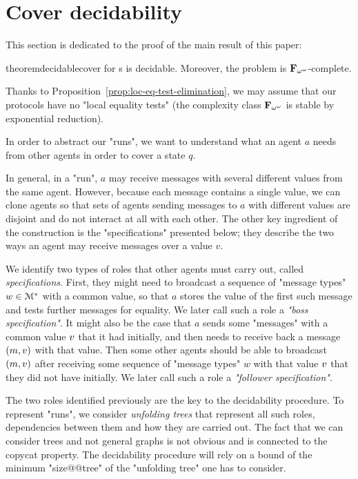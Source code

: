 \section{Cover decidability}
\label{sec:cover-decidability}

This section is dedicated to the proof of the main result of this paper:

\begin{restatable}{theorem}{decidablecover}
\label{thm:decidable-cover}
\COVER for \BNRA{}s is decidable. Moreover, the problem is $\mathbf{F}_{\omega^\omega}$-complete.
\end{restatable}

Thanks to Proposition~\ref{prop:loc-eq-test-elimination}, we may assume that our protocols have no "local equality tests" (the complexity class $\mathbf{F}_{\omega^{\omega}}$ is stable by exponential reduction).

In order to abstract our "runs", we want to understand what an agent $a$ needs from other agents in order to cover a state $q$. 

In general, in a "run", $a$ may receive messages with several different values from the same agent. However, because each message contains a single value, we can clone agents so that sets of agents sending messages to $a$ with different values are disjoint and do not interact at all with each other. The other key ingredient of the construction is the "specifications" presented below; they describe the two ways an agent may receive messages over a value $v$.

We identify two types of roles that other agents must carry out, called \emph{specifications}. First, they might need to broadcast a sequence of "message types" $w \in \mathcal{M}^*$ with a common value, so that $a$ stores the value of the first such message and tests further messages for equality. We later call such a role a \emph{"boss specification"}.  
It might also be the case that $a$ sends some "messages" with a common value $v$ that it had initially, and then needs to receive back a message $(m, v)$ with that value. Then some other agents should be able to  broadcast $(m, v)$ after receiving some sequence of "message types" $w$ with that value $v$ that they did not have initially. We later call such a role a \emph{"follower specification"}.

The two roles identified previously are the key to the decidability procedure.
To represent "runs", we consider \emph{unfolding trees} that represent all such roles, dependencies between them and how they are carried out. The fact that we can consider trees and not general graphs is not obvious and is connected to the copycat property.  The decidability procedure will rely on a bound of the minimum "size@@tree" of the "unfolding tree" one has to consider.

